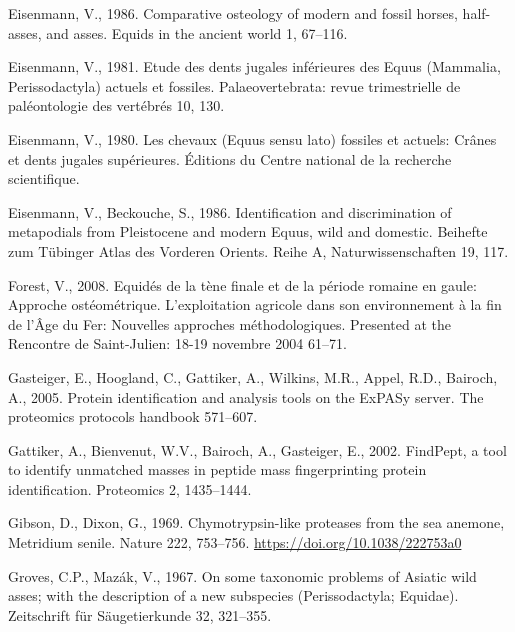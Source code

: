 \documentclass[preprint, 3p, authoryear]{elsarticle} %
\newlength{\cslhangindent}
\newlength{\cslentryspacingunit} %
\newenvironment{CSLReferences}[2] %
 {%
  \setlength{\parindent}{0pt}
  \ifodd #1
  \let\oldpar\par
  \def\par{\hangindent=\cslhangindent\oldpar}
  \fi
  \setlength{\parskip}{#2\cslentryspacingunit}
 }%
 {}
\begin{document}
\begin{CSLReferences}{1}{0}
\leavevmode{}%
Eisenmann, V., 1986. Comparative osteology of modern and fossil horses, half-asses, and asses. Equids in the ancient world 1, 67--116.

\leavevmode{}%
Eisenmann, V., 1981. Etude des dents jugales inférieures des {Equus} ({Mammalia}, {Perissodactyla}) actuels et fossiles. Palaeovertebrata: revue trimestrielle de paléontologie des vertébrés 10, 130.

\leavevmode{}%
Eisenmann, V., 1980. Les chevaux ({Equus} sensu lato) fossiles et actuels: Crânes et dents jugales supérieures. {Éditions du Centre national de la recherche scientifique}.

\leavevmode{}%
Eisenmann, V., Beckouche, S., 1986. Identification and discrimination of metapodials from {Pleistocene} and modern {Equus}, wild and domestic. Beihefte zum Tübinger Atlas des Vorderen Orients. Reihe A, Naturwissenschaften 19, 117.

\leavevmode{}%
Forest, V., 2008. Equidés de la tène finale et de la période romaine en gaule: Approche ostéométrique. L'exploitation agricole dans son environnement à la fin de l'Âge du Fer: Nouvelles approches méthodologiques. Presented at the Rencontre de Saint-Julien: 18-19 novembre 2004 61--71.

\leavevmode{}%
Gasteiger, E., Hoogland, C., Gattiker, A., Wilkins, M.R., Appel, R.D., Bairoch, A., 2005. Protein identification and analysis tools on the {ExPASy} server. The proteomics protocols handbook 571--607.

\leavevmode{}%
Gattiker, A., Bienvenut, W.V., Bairoch, A., Gasteiger, E., 2002. {FindPept}, a tool to identify unmatched masses in peptide mass fingerprinting protein identification. Proteomics 2, 1435--1444.

\leavevmode{}%
Gibson, D., Dixon, G., 1969. Chymotrypsin-like proteases from the sea anemone, {Metridium} senile. Nature 222, 753--756. \url{https://doi.org/10.1038/222753a0}

\leavevmode{}%
Groves, C.P., Mazák, V., 1967. On some taxonomic problems of {Asiatic} wild asses; with the description of a new subspecies ({Perissodactyla}; {Equidae}). Zeitschrift für Säugetierkunde 32, 321--355.


\end{CSLReferences}
\end{document}
